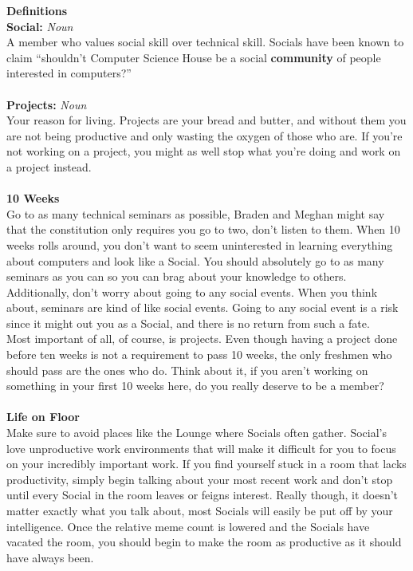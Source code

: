 \documentclass[10pt]{extarticle} %
\begin{document}
\begin{minipage}[t]{.61\linewidth} %
\vspace{-0.4cm}
\hypertarget{firstnews}{}
\textbf{Definitions} \\
\textbf{Social:} \textit{Noun} \\
A member who values social skill over technical skill. Socials have been known to claim “shouldn't Computer Science House be a social \textbf{community} of people interested in computers?” \\ \\
\textbf{Projects:} \textit{Noun} \\
Your reason for living. Projects are your bread and butter, and without them you are not being productive and only wasting the oxygen of those who are. If you're not working on a project, you might as well stop what you're doing and work on a project instead. \\ \\
\textbf{10 Weeks} \\
Go to as many technical seminars as possible, Braden and Meghan might say that the constitution only requires you go to two, don’t listen to them. When 10 weeks rolls around, you don’t want to seem uninterested in learning everything about computers and look like a Social. You should absolutely go to as many seminars as you can so you can brag about your knowledge to others. \\
Additionally, don’t worry about going to any social events. When you think about, seminars are kind of like social events. Going to any social event is a risk since it might out you as a Social, and there is no return from such a fate. \\
Most important of all, of course, is projects. Even though having a project done before ten weeks is not a requirement to pass 10 weeks, the only freshmen who should pass are the ones who do. Think about it, if you aren't working on something in your first 10 weeks here, do you really deserve to be a member? \\\\ 
\textbf{Life on Floor} \\
Make sure to avoid places like the Lounge where Socials often gather. Social's love unproductive work environments that will make it difficult for you to focus on your incredibly important work. If you find yourself stuck in a room that lacks productivity, simply begin talking about your most recent work and don’t stop until every Social in the room leaves or feigns interest. Really though, it doesn’t matter exactly what you talk about, most Socials will easily be put off by your intelligence. Once the relative meme count is lowered and the Socials have vacated the room, you should begin to make the room as productive as it should have always been.\\\\ 

\end{minipage}
\end{document}
